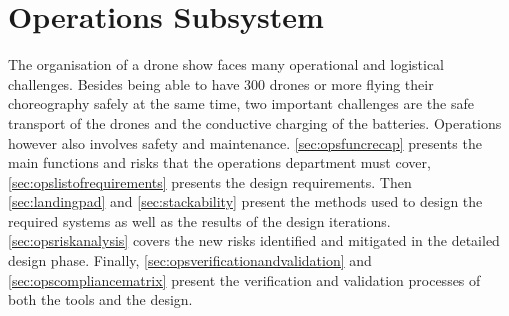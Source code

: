 \chapter{Operations Subsystem}
\label{ch:operations}

    

The organisation of a drone show faces many operational and logistical challenges. Besides being able to have 300 drones or more flying their choreography safely at the same time, two important challenges are the safe transport of the drones and the conductive charging of the batteries. Operations however also involves safety and maintenance. \autoref{sec:opsfuncrecap} presents the main functions and risks that the operations department must cover, \autoref{sec:opslistofrequirements} presents the design requirements. Then \autoref{sec:landingpad} and \autoref{sec:stackability} present the methods used to design the required systems as well as the results of the design iterations. \autoref{sec:opsriskanalysis} covers the new risks identified and mitigated in the detailed design phase. Finally, \autoref{sec:opsverificationandvalidation} and \autoref{sec:opscompliancematrix} present the verification and validation processes of both the tools and the design. 


